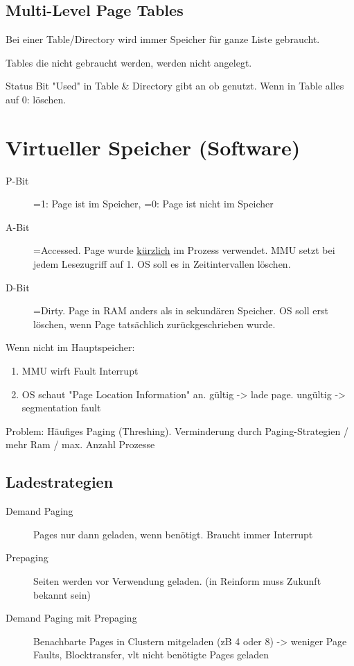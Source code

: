 \begin{multicols*}{4}
\subsection{Multi-Level Page Tables}
Bei einer Table/Directory wird immer Speicher für ganze Liste gebraucht.

Tables die nicht gebraucht werden, werden nicht angelegt.

Status Bit "Used" in Table \& Directory gibt an ob genutzt. Wenn in Table alles auf 0: löschen.

\section{Virtueller Speicher (Software)}
\begin{description}
    \item[P-Bit] =1: Page ist im Speicher, =0: Page ist nicht im Speicher
    \item[A-Bit] =Accessed. Page wurde \underline{kürzlich} im Prozess verwendet. MMU setzt bei jedem Lesezugriff auf 1. OS soll es in Zeitintervallen löschen.
    \item[D-Bit] =Dirty. Page in RAM anders als in sekundären Speicher. OS soll erst löschen, wenn Page tatsächlich zurückgeschrieben wurde.
\end{description}
\vspace{2pt}
Wenn nicht im Hauptspeicher:
\begin{enumerate}
    \item MMU wirft Fault Interrupt
    \item OS schaut "Page Location Information" an. gültig -> lade page. ungültig -> segmentation fault
\end{enumerate}

Problem: Häufiges Paging (Threshing). Verminderung durch Paging-Strategien / mehr Ram / max. Anzahl Prozesse

\subsection{Ladestrategien}
\begin{description}
    \item[Demand Paging] Pages nur dann geladen, wenn benötigt. Braucht immer Interrupt
    \item[Prepaging] Seiten werden vor Verwendung geladen. (in Reinform muss Zukunft bekannt sein)
    \item[Demand Paging mit Prepaging] Benachbarte Pages in Clustern mitgeladen (zB 4 oder 8)
    -> weniger Page Faults, Blocktransfer, vlt nicht benötigte Pages geladen
\end{description}


\end{multicols*}
